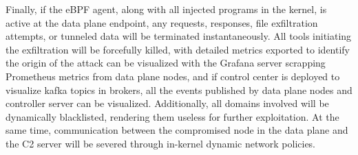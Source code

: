 \documentclass [11pt, proquest] {uwthesis}[2020/02/24]
\begin{document}
Finally, if the eBPF agent, along with all injected programs in the kernel, is active at the data plane endpoint, any requests, responses, file exfiltration attempts, or tunneled data will be terminated instantaneously. All tools initiating the exfiltration will be forcefully killed, with detailed metrics exported to identify the origin of the attack can be visualized with the Grafana server scrapping Prometheus metrics from data plane nodes, and if control center is deployed to visualize kafka topics in brokers, all the events published by data plane nodes and controller server can be visualized. Additionally, all domains involved will be dynamically blacklisted, rendering them useless for further exploitation. At the same time, communication between the compromised node in the data plane and the C2 server will be severed through in-kernel dynamic network policies.


\end{document}
